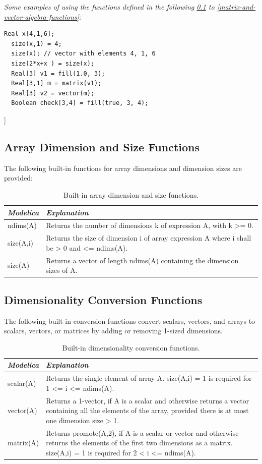 \documentclass[10pt,a4paper]{report}
\def\doublelabel#1{\label{#1}\hypertarget{#1}{}}
\begin{document}
\emph{Some examples of using the functions defined in the following
\ref{array-dimension-and-size-functions} to \ref{matrix-and-vector-algebra-functions}}:

\begin{lstlisting}[language=modelica]
  Real x[4,1,6];
  size(x,1) = 4;
  size(x); // vector with elements 4, 1, 6
  size(2*x+x ) = size(x);
  Real[3] v1 = fill(1.0, 3);
  Real[3,1] m = matrix(v1);
  Real[3] v2 = vector(m);
  Boolean check[3,4] = fill(true, 3, 4);
\end{lstlisting}
{]}

\subsection{Array Dimension and Size Functions}\doublelabel{array-dimension-and-size-functions}

The following built-in functions for array dimensions and dimension
sizes are provided:

\begin{longtable}[]{|l|p{9cm}|}
\caption{Built-in array dimension and size functions.}\\
\hline
\emph{Modelica} & \emph{Explanation}\\ \hline
\endhead
ndims(A) & 
Returns the number of dimensions k of expression A, with k
\textgreater{}= 0.
\\ \hline
size(A,i) &
Returns the size of dimension i of array expression A where i shall be
\textgreater{} 0 and \textless{}= ndims(A).\\ \hline
size(A) &
Returns a vector of length ndims(A) containing the dimension sizes of
A.\\ \hline
\end{longtable}

\subsection{Dimensionality Conversion Functions}\doublelabel{dimensionality-conversion-functions}

The following built-in conversion functions convert scalars, vectors,
and arrays to scalars, vectors, or matrices by adding or removing
1-sized dimensions.

\begin{longtable}[]{|l|p{9cm}|}
\caption{Built-in dimensionality conversion functions.}\\
\hline
\emph{Modelica} & \emph{Explanation}\\ \hline
\endhead
scalar(A) & Returns the single element of array A. size(A,i) = 1 is required for 1
\textless{}= i \textless{}= ndims(A).\\ \hline
vector(A)
& 
Returns a 1-vector, if A is a scalar and otherwise returns a vector
containing all the elements of the array, provided there is at most one
dimension size \textgreater{} 1.\\ \hline
matrix(A)
& 
Returns promote(A,2), if A is a scalar or vector and otherwise returns
the elements of the first two dimensions as a matrix. size(A,i) = 1 is
required for 2 \textless{} i \textless{}= ndims(A).\\ \hline
\end{longtable}
\end{document}
